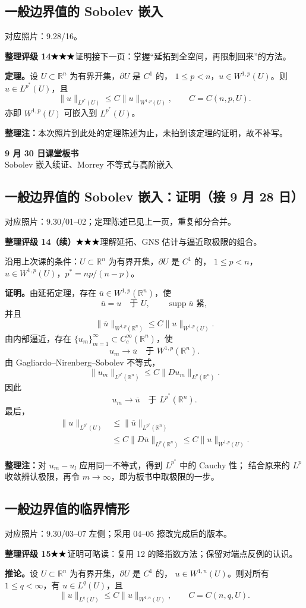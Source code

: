 \documentclass[UTF8,a4paper,11pt,fontset=fandol]{ctexart}
\newcommand{\R}{\mathbb R}
\newcommand{\ednote}[1]{\par{\small\color{notegray}\textbf{整理注：}#1}\par}
\newcommand{\source}[1]{{\small\color{notegray}对应照片：#1。}\par}
\newcommand{\proofstars}[1]{\ensuremath{%
\ifnum#1>0\relax\bigstar\fi
\ifnum#1>1\relax\bigstar\fi
\ifnum#1>2\relax\bigstar\fi
\ifnum#1>3\relax\bigstar\fi
\ifnum#1>4\relax\bigstar\fi}}
\newcommand{\proofrating}[3]{\par{\small\color{proofblue}%
\textbf{整理评级 #1}\enspace\proofstars{#2}\quad #3\par}}
\begin{document}
\subsection{一般边界值的 Sobolev 嵌入}
\source{9.28/16}
\proofrating{14}{3}{证明接下一页：掌握“延拓到全空间，再限制回来”的方法。}
\textbf{定理。}设 $U\subset\R^n$ 为有界开集，$\partial U$ 是 $C^1$ 的，
$1\leq p<n$，$u\in W^{1,p}(U)$。则 $u\in L^{p^*}(U)$，且
\[
\|u\|_{L^{p^*}(U)}\leq C\|u\|_{W^{1,p}(U)},\qquad C=C(n,p,U).
\]
亦即 $W^{1,p}(U)$ 可嵌入到 $L^{p^*}(U)$。
\ednote{本次照片到此处的定理陈述为止，未拍到该定理的证明，故不补写。}

\newpage
{}
\begin{center}
{\LARGE\bfseries 9 月 30 日课堂板书}\\[5pt]
{Sobolev 嵌入续证、Morrey 不等式与高阶嵌入}
\end{center}

\subsection*{一般边界值的 Sobolev 嵌入：证明（接 9 月 28 日）}
\source{9.30/01--02；定理陈述已见上一页，重复部分合并}
\proofrating{14（续）}{3}{理解延拓、GNS 估计与逼近取极限的组合。}
沿用上次课的条件：$U\subset\R^n$ 为有界开集，$\partial U$ 是 $C^1$ 的，
$1\leq p<n$，$u\in W^{1,p}(U)$，$p^*=np/(n-p)$。

\textbf{证明。}由延拓定理，存在 $\overline u\in W^{1,p}(\R^n)$，使
\[
\overline u=u\quad\text{于 }U,\qquad
\operatorname{supp}\overline u\text{ 紧},
\]
并且
\[
\|\overline u\|_{W^{1,p}(\R^n)}
\leq C\|u\|_{W^{1,p}(U)}.
\]
由内部逼近，存在 $\{u_m\}_{m=1}^{\infty}\subset C_c^\infty(\R^n)$，使
\[
u_m\longrightarrow\overline u\quad\text{于 }W^{1,p}(\R^n).
\]
由 Gagliardo--Nirenberg--Sobolev 不等式，
\[
\|u_m\|_{L^{p^*}(\R^n)}
\leq C\|Du_m\|_{L^p(\R^n)}.
\]
因此
\[
u_m\longrightarrow\overline u\quad\text{于 }L^{p^*}(\R^n).
\]
最后，
\[
\begin{aligned}
\|u\|_{L^{p^*}(U)}
&\leq\|\overline u\|_{L^{p^*}(\R^n)}\\
&\leq C\|D\overline u\|_{L^p(\R^n)}
\leq C\|u\|_{W^{1,p}(U)}.
\end{aligned}
\]
\ednote{对 $u_m-u_l$ 应用同一不等式，得到 $L^{p^*}$ 中的 Cauchy 性；
结合原来的 $L^p$ 收敛辨认极限，再令 $m\to\infty$，即为板书中取极限的一步。}

\newpage
\subsection{一般边界值的临界情形}
\source{9.30/03--07 左侧；采用 04--05 擦改完成后的版本}
\proofrating{15}{2}{证明可略读：复用 12 的降指数方法；保留对端点反例的认识。}
\textbf{推论。}设 $U\subset\R^n$ 为有界开集，$\partial U$ 是 $C^1$ 的，
$u\in W^{1,n}(U)$。则对所有 $1\leq q<\infty$，有 $u\in L^q(U)$，且
\[
\|u\|_{L^q(U)}
\leq C\|u\|_{W^{1,n}(U)},\qquad C=C(n,q,U).
\]
\end{document}
